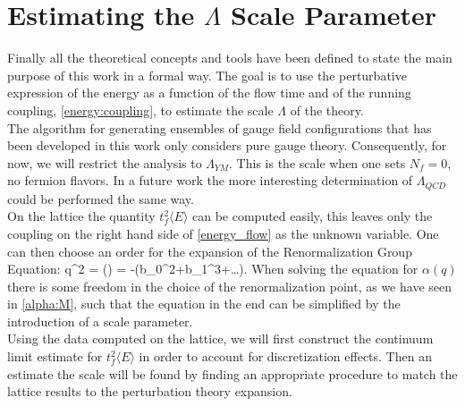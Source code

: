 \section{Estimating the $\Lambda$ Scale Parameter}
Finally all the theoretical concepts and tools have been defined to state the main purpose of this work in a formal way. The goal is to use the perturbative expression of the energy as a function of the flow time and of the running coupling, \cref{energy:coupling}, to estimate the scale $\Lambda$ of the theory. \\
The algorithm for generating ensembles of gauge field configurations that has been developed in this work only considers pure gauge theory. Consequently, for now, we will restrict the analysis to $\Lambda_{YM}$. This is the scale when one sets $N_f = 0$, no fermion flavors. In a future work the more interesting determination of $\Lambda_{QCD}$ could be performed the same way. \\
On the lattice the quantity $t_f^2\langle E \rangle$ can be computed easily, this leaves only the coupling on the right hand side of \cref{energy_flow} as the unknown variable. One can then choose an order for the expansion of the Renormalization Group Equation:
\beq
q^2  = \beta(\alpha) = -(b_0\alpha^2+b_1\alpha^3+\dots).
\eeq
When solving the equation for $\alpha(q)$ there is some freedom in the choice of the renormalization point, as we have seen in \cref{alpha:M}, such that the equation in the end can be simplified by the introduction of a scale parameter.\\
Using the data computed on the lattice, we will first construct the continuum limit estimate for $t_f^2\langle E \rangle$ in order to account for discretization effects. Then an estimate the scale will be found by finding an appropriate procedure to match the lattice results to the perturbation theory expansion. 


